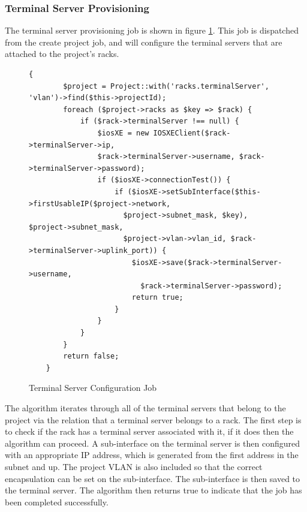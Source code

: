 \subsubsection{Terminal Server Provisioning}
The terminal server provisioning job is shown in figure \ref{fig:terminal-server-configuration-job}. This job is dispatched from the create project job, and will configure the terminal servers that are attached to the project's racks.
\begin{figure}[H]
    \begin{lstlisting}[basicstyle=\scriptsize]
    {
        $project = Project::with('racks.terminalServer', 'vlan')->find($this->projectId);
        foreach ($project->racks as $key => $rack) {
            if ($rack->terminalServer !== null) {
                $iosXE = new IOSXEClient($rack->terminalServer->ip,
                $rack->terminalServer->username, $rack->terminalServer->password);
                if ($iosXE->connectionTest()) {
                    if ($iosXE->setSubInterface($this->firstUsableIP($project->network,
                      $project->subnet_mask, $key), $project->subnet_mask,
                      $project->vlan->vlan_id, $rack->terminalServer->uplink_port)) {
                        $iosXE->save($rack->terminalServer->username,
                          $rack->terminalServer->password);
                        return true;
                    }
                }
            }
        }
        return false;
    }
    \end{lstlisting}
    \caption{Terminal Server Configuration Job}
    \label{fig:terminal-server-configuration-job}
\end{figure}
The algorithm iterates through all of the terminal servers that belong to the project via the relation that a terminal server belongs to a rack. The first step is to check if the rack has a terminal server associated with it, if it does then the algorithm can proceed. A sub-interface on the terminal server is then configured with an appropriate IP address, which is generated from the first address in the subnet and up. The project VLAN is also included so that the correct encapsulation can be set on the sub-interface. The sub-interface is then saved to the terminal server. The algorithm then returns true to indicate that the job has been completed successfully.